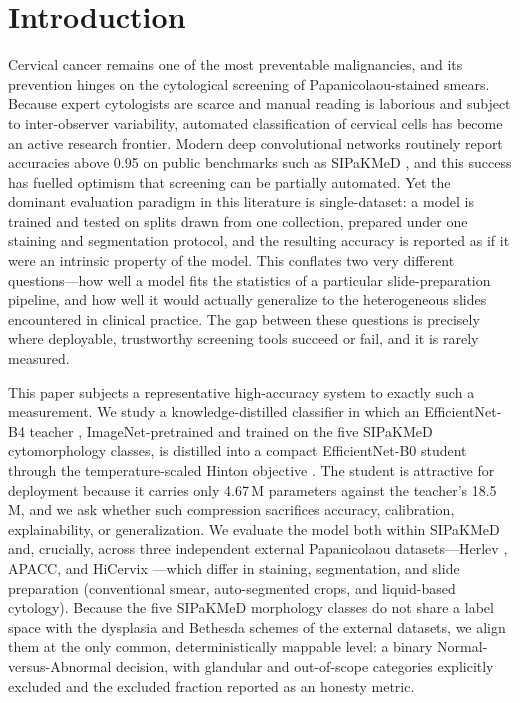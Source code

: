 \documentclass[twocolumn]{article}
\begin{document}
\section{Introduction}

Cervical cancer remains one of the most preventable malignancies, and its prevention hinges on the cytological screening of Papanicolaou-stained smears. Because expert cytologists are scarce and manual reading is laborious and subject to inter-observer variability, automated classification of cervical cells has become an active research frontier. Modern deep convolutional networks routinely report accuracies above 0.95 on public benchmarks such as SIPaKMeD \citep{plissiti2018sipakmed}, and this success has fuelled optimism that screening can be partially automated. Yet the dominant evaluation paradigm in this literature is single-dataset: a model is trained and tested on splits drawn from one collection, prepared under one staining and segmentation protocol, and the resulting accuracy is reported as if it were an intrinsic property of the model. This conflates two very different questions---how well a model fits the statistics of a particular slide-preparation pipeline, and how well it would actually generalize to the heterogeneous slides encountered in clinical practice. The gap between these questions is precisely where deployable, trustworthy screening tools succeed or fail, and it is rarely measured.

This paper subjects a representative high-accuracy system to exactly such a measurement. We study a knowledge-distilled classifier in which an EfficientNet-B4 teacher \citep{tan2019efficientnet}, ImageNet-pretrained \citep{deng2009imagenet} and trained on the five SIPaKMeD cytomorphology classes, is distilled into a compact EfficientNet-B0 student through the temperature-scaled Hinton objective \citep{hinton2015distilling}. The student is attractive for deployment because it carries only 4.67\,M parameters against the teacher's 18.5\,M, and we ask whether such compression sacrifices accuracy, calibration, explainability, or generalization. We evaluate the model both within SIPaKMeD and, crucially, across three independent external Papanicolaou datasets---Herlev \citep{jantzen2005herlev}, APACC, and HiCervix \citep{cai2024hicervix}---which differ in staining, segmentation, and slide preparation (conventional smear, auto-segmented crops, and liquid-based cytology). Because the five SIPaKMeD morphology classes do not share a label space with the dysplasia and Bethesda \citep{nayar2015bethesda} schemes of the external datasets, we align them at the only common, deterministically mappable level: a binary Normal-versus-Abnormal decision, with glandular and out-of-scope categories explicitly excluded and the excluded fraction reported as an honesty metric.
\end{document}
